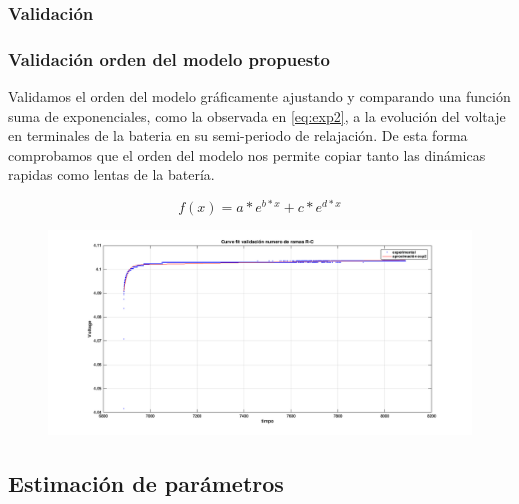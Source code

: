 \documentclass[10pt]{beamer}
\theoremstyle{remark}
\theoremstyle{definition}
\begin{document}
\subsubsection{Validación}
\begin{frame}
\frametitle{Validación orden del modelo propuesto}

Validamos el orden del modelo gráficamente ajustando y comparando una función suma de exponenciales, como la observada en \ref{eq:exp2}, a la evolución del voltaje en terminales de la bateria en su semi-periodo de relajación. De esta forma comprobamos que el orden del modelo nos permite copiar tanto las dinámicas rapidas como lentas de la batería. 

\begin{equation}
f(x) = a*e^{b*x} + c*e^{d*x}
\label{eq:exp2}
\end{equation}

\begin{figure}
	\centering
\includegraphics[width=0.9\linewidth]{images/exp_ord_2_val.png}
\caption{}
\label{fig:val_exp2}
\end{figure}

\end{frame}

\subsection{Estimación de parámetros}
\end{document}
